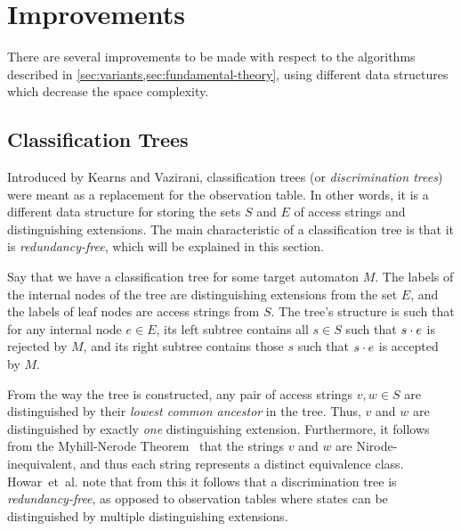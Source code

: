 \documentclass[multi,crop=false,class=article]{standalone}
\begin{document}
\section{Improvements}
\label{sec:improvements}
There are several improvements to be made with respect to the algorithms
described in \cref{sec:variants,sec:fundamental-theory}, using different data
structures which decrease the space complexity.

\subsection{Classification Trees}
\label{sec:classification-trees}
Introduced by Kearns and Vazirani\cite{Kearns94}, classification trees (or
\textit{discrimination trees}) were meant as a replacement for the observation
table. In other words, it is a different data
structure for storing the sets $S$ and $E$ of access strings and distinguishing
extensions. The main characteristic of a classification tree is that it is
\textit{redundancy-free}, which will be explained in this section.

Say that we have a classification tree for some target automaton $M$. The labels
of the internal nodes of the tree are distinguishing extensions from the set
$E$, and the labels of leaf nodes are access strings from $S$. The tree's
structure is such that for any internal node $e \in E$, its left subtree
contains all $s \in S$ such that $s \cdot e$ is rejected by $M$, and its right subtree
contains those $s$ such that $s \cdot e$ is accepted by $M$.

From the way the tree is constructed, any pair of access strings $v,w \in S$ are
distinguished by their \textit{lowest common ancestor} in the tree. Thus, $v$
and $w$ are distinguished by exactly \textit{one} distinguishing
extension. Furthermore, it follows from the Myhill-Nerode
Theorem~ that the strings $v$ and $w$ are
Nirode-inequivalent, and thus each string represents a distinct equivalence
class. Howar~et~al. note that from this it follows
that a discrimination tree is \textit{redundancy-free}, as opposed to
observation tables where states can be distinguished by multiple distinguishing
extensions\cite{Howar14}.
\end{document}
